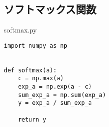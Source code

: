 \documentclass{ujarticle}
\begin{document}
\subsection{ソフトマックス関数}


softmax.py
\begin{lstlisting}[basicstyle=\ttfamily\footnotesize, frame=single]
import numpy as np


def softmax(a):
    c = np.max(a)
    exp_a = np.exp(a - c)
    sum_exp_a = np.sum(exp_a)
    y = exp_a / sum_exp_a

    return y
\end{lstlisting}

\begin{lstlisting}[basicstyle=\ttfamily\footnotesize, frame=single]
\end{lstlisting}

\begin{center}
\end{center}
\end{document}
